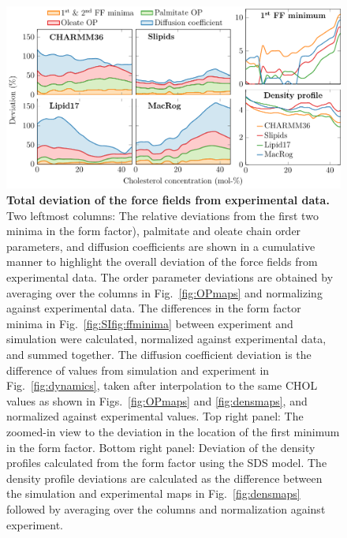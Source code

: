 \documentclass[aps,prl,superscriptaddress]{revtex4-2}
\begin{document}
\begin{figure}[htb!]
  \centering
  \includegraphics[width=\linewidth]{../FIGS/deviation.pdf}
  \caption{\label{fig:deviation}%
  \textbf{Total deviation of the force fields from experimental data.} 
%
  Two leftmost columns:
  The relative deviations from the first two minima in the form factor), palmitate and oleate chain order parameters, and diffusion coefficients are shown in a cumulative manner to highlight the overall deviation of the force fields from experimental data.
  The order parameter deviations are obtained by averaging over the columns in Fig.~\ref{fig:OPmaps} and normalizing against experimental data. The differences in the form factor minima in Fig.~\ref{fig:SIfig:ffminima} between experiment and simulation were calculated, normalized against experimental data, and summed together. The diffusion coefficient deviation is the difference of values from simulation and experiment in Fig.~\ref{fig:dynamics}, taken after interpolation to the same CHOL values as shown in Figs.~\ref{fig:OPmaps} and \ref{fig:densmaps}, and normalized against experimental values.
%
  Top right panel: 
  The zoomed-in view to the deviation in the location of the first minimum in the form factor.
%
  Bottom right panel:
  Deviation of the density profiles calculated from the form factor using the SDS model. The density profile deviations are calculated as the difference between the simulation and experimental maps in Fig.~\ref{fig:densmaps} followed by averaging over the columns and normalization against experiment.
  }
\end{figure}

\end{document}
